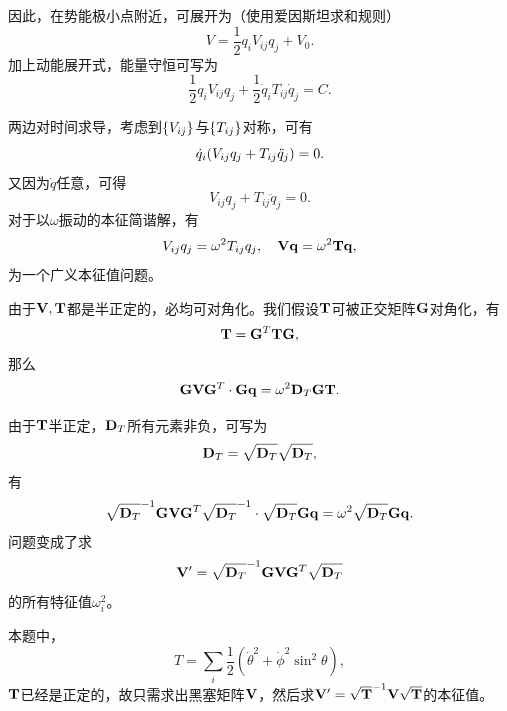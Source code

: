 因此，在势能极小点附近，可展开为（使用爱因斯坦求和规则）
\begin{equation}
    V = \frac{1}{2}q_iV_{ij}q_j + V_0.
\end{equation}
加上动能展开式，能量守恒可写为
\begin{equation}
    \frac{1}{2}q_iV_{ij}q_j
    + \frac{1}{2}\dot{q}_iT_{ij}\dot{q}_j
    = C.
\end{equation}

两边对时间求导，考虑到$\qty{V_{ij}}$与$\qty{T_{ij}}$对称，可有
\begin{equation}
    \dot{q}_i
    \qty(V_{ij}q_j + T_{ij}\ddot{q}_j)
    = 0.
\end{equation}
又因为$\dot{q}$任意，可得
\begin{equation}
    V_{ij}q_j + T_{ij}\ddot{q}_j = 0.
\end{equation}
对于以$\omega$振动的本征简谐解，有
\begin{equation}
    V_{ij}q_j = \omega^2T_{ij}q_j,\quad
    \vb{V}\vb{q} = \omega^2 \vb{T}\vb{q},
\end{equation}
为一个广义本征值问题。

由于$\vb{V}, \vb{T}$都是半正定的，必均可对角化。我们假设$\vb{T}$可被正交矩阵$\vb{G}$对角化，有
\begin{equation}
    \vb{T} = \vb{G}^T\vb{T}\vb{G},
\end{equation}
那么
\begin{equation}
    \vb{G}\vb{V}\vb{G}^T\cdot\vb{G}\vb{q} = \omega^2\vb{D}_T\vb{G}\vb{T}.
\end{equation}

由于$\vb{T}$半正定，$\vb{D}_T$所有元素非负，可写为
\begin{equation}
    \vb{D}_T = \sqrt{\vb{D}_T}\sqrt{\vb{D}_T},
\end{equation}
有
\begin{equation}
    \sqrt{\vb{D}_T}^{-1}\vb{G}\vb{V}\vb{G}^T\sqrt{\vb{D}_T}^{-1}
    \cdot \sqrt{\vb{D}_T}\vb{G}\vb{q}
    = \omega^2\sqrt{\vb{D}_T}\vb{G}\vb{q}.
\end{equation}
问题变成了求
\begin{equation}
    \vb{V}' = \sqrt{\vb{D}_T}^{-1}\vb{G}\vb{V}\vb{G}^T\sqrt{\vb{D}_T}
\end{equation}
的所有特征值$\omega^2_i$。

本题中，
\begin{equation}
    T = \sum_{i}\frac{1}{2}(\dot{\theta}^2 + \dot{\phi}^2\sin^2{\theta}),
\end{equation}
$\vb{T}$已经是正定的，故只需求出黑塞矩阵$\vb{V}$，然后求$\vb{V}' = \sqrt{\vb{T}}^{-1}\vb{V}\sqrt{\vb{T}}$的本征值。


